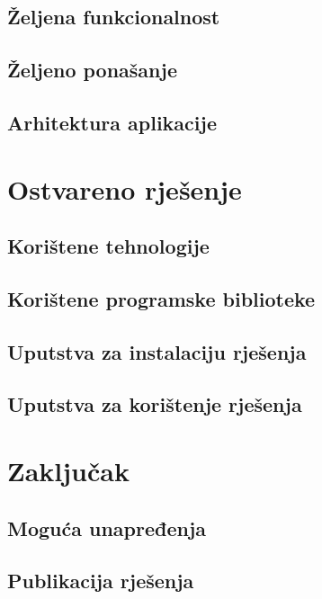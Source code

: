 \documentclass[times, utf8, zavrsni]{fer}
\begin{document}
\section{Željena funkcionalnost}

\section{Željeno ponašanje}

\section{Arhitektura aplikacije}



\chapter{Ostvareno rješenje}

\section{Korištene tehnologije}

\section{Korištene programske biblioteke}

\section{Uputstva za instalaciju rješenja}

\section{Uputstva za korištenje rješenja}



\chapter{Zaključak}

\section{Moguća unapređenja}

\section{Publikacija rješenja}
\end{document}

